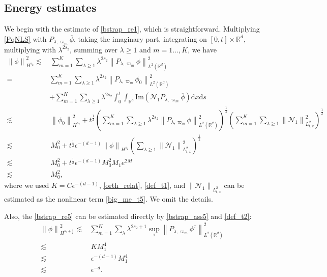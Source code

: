 \documentclass[10pt,twoside,a4paper]{article}
\numberwithin{equation}{section}\allowdisplaybreaks
\def\geq{\geqslant}
\begin{document}
\subsection{Energy estimates} \label{s_big.2}
We begin with the  estimate of \eqref{bstrap_re1}, which is straightforward.  
Multiplying \eqref{PqNLS} with $ P_{\lambda, \varpi_m}   \overline{\phi} $, taking the imaginary part,  integrating on $ [0,t]\times \mathbb{R}^d $, multiplying with $\lambda^{2s_2}$, summing over $\lambda \geq 1$ and $m=1\dots, K$, we have
\begin{align*}
\left\|\phi \right\|_{H^{s_2}}^2\lesssim &\,\sum_{m=1}^K\sum_{\lambda\geq 1}	\lambda^{2s_2} \left\|P_{\lambda, \varpi_m}  \phi \right\|_{L^{2}(\mathbb{R}^d)}^2\\
=& \sum_{m=1}^K\sum_{\lambda\geq 1}	\lambda^{2s_2} \left\|P_{\lambda, \varpi_m}  \phi_0 \right\|_{L^{2}(\mathbb{R}^d)}^2\\
&+\sum_{m=1}^K \sum_{\lambda\geq 1}	\lambda^{2s_2} \int_0^t \int_{\mathbb{R}^d}  \mathrm{Im} \left(   \mathcal{N}_1 P_{\lambda, \varpi_m}  \overline{\phi}\right)  \mathrm{d} x \mathrm{d} s\nonumber\\
	\lesssim &\,\left\|\phi_0 \right\|_{H^{s_2}}^2+  t^{\frac12}  \left( \sum_{m=1}^K\sum_{\lambda\geq 1}	\lambda^{2s_2} \left\|P_{\lambda, \varpi_m}  \phi \right\|_{L^{2}(\mathbb{R}^d)}^2\right)^{\frac 12} 
 \left(\sum_{m=1}^K\sum_{\lambda\geq 1}\left\|\mathcal{N}_1\right\|_{L^2_{t,x}}^2\right)^{\frac 12}\\
 \lesssim &\,M_0^2+  t^{\frac12}   \epsilon^{-(d-1)}  \left\|\phi \right\|_{H^{s_2}}
 \left( \sum_{\lambda\geq 1}\left\|\mathcal{N}_1\right\|_{L^2_{t,x}}^2\right)^{\frac 12} \\
 \lesssim &\,M_0^2 + t^{\frac12}  \epsilon^{-(d-1)}   M_0^2 M_1 e^{2M}\\
 \lesssim &\, M_0^2,
\end{align*}
where we used  $K = C \epsilon^{-(d-1)}$, \eqref{orth_relat}, \eqref{def_t1},  and $\left\|\mathcal{N}_1\right\|_{L^2_{t,x}} $ can be estimated  as the nonlinear  term \eqref{big_me_t5}.   We  omit the details.

Also, the \eqref{bstrap_re5} can be estimated directly by \eqref{bstrap_ass5} and \eqref{def_t2}:
\begin{align*}
	\left\|\phi\right\|_{H^{s_2+\frac 12}}^2\lesssim& \sum_{m=1}^K	\sum_{\lambda} \lambda^{2s_2+1} \sup_{\tau}\left\| P_{\lambda, \varpi_m}  \phi^\tau\right\|_{L^2(\mathbb{R}^d)}^2 \\
	\lesssim &\, K M_1^4\\
	\lesssim & \,\epsilon^{-(d-1)} M_1^4 \\
	\lesssim &\, \epsilon^{-d}.
\end{align*}
\end{document}

